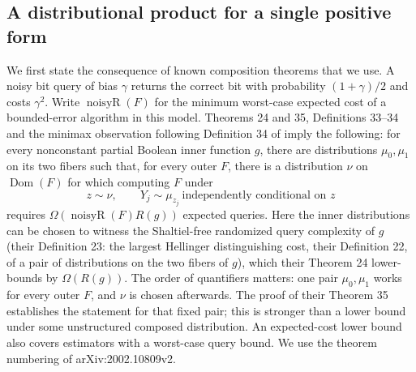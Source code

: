 \subsection{A distributional product for a single positive form}
We first state the consequence of known composition theorems that we
use. A noisy bit query of bias $\gamma$ returns
the correct bit with probability $(1+\gamma)/2$ and costs $\gamma^2$.
Write $\operatorname{noisyR}(F)$ for the minimum worst-case expected
cost of a bounded-error algorithm in this model. Theorems 24 and 35,
Definitions 33--34 and the minimax observation following Definition 34
of \citet{BenDavidBlais2020} imply the following: for every nonconstant partial
Boolean inner function $g$, there are distributions $\mu_0,\mu_1$ on
its two fibers such that, for every outer $F$, there is a distribution
$\nu$ on $\operatorname{Dom}(F)$ for which computing $F$ under
\begin{equation}\label{eq:product-hard-distribution}
 z\sim\nu,\qquad Y_j\sim\mu_{z_j}\ \text{independently conditional on }z
\end{equation}
requires $\Omega(\operatorname{noisyR}(F)R(g))$ expected queries.
Here the inner distributions can be chosen to witness the
Shaltiel-free randomized query complexity of $g$ (their Definition 23:
the largest Hellinger distinguishing cost, their Definition 22, of a
pair of distributions on the two fibers of $g$), which their Theorem 24
lower-bounds by
$\Omega(R(g))$. The order of quantifiers matters: one pair
$\mu_0,\mu_1$ works for every outer $F$, and $\nu$ is chosen afterwards.
The proof of their Theorem 35 establishes the statement for that fixed
pair; this is stronger than a lower bound under some unstructured
composed distribution. An expected-cost lower bound also covers
estimators with a worst-case query bound. We use the
theorem numbering of arXiv:2002.10809v2.

